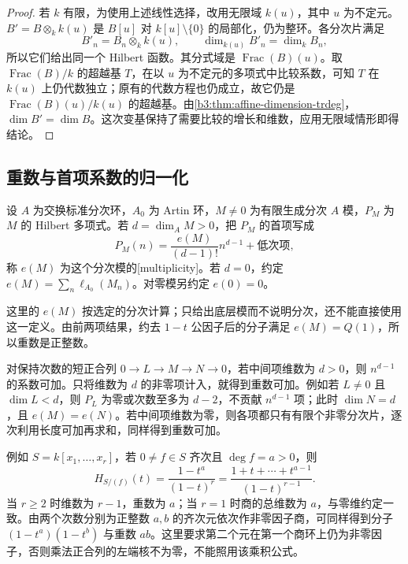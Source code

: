 \begin{proof}
	若 \(k\) 有限，为使用上述线性选择，改用无限域 \(k(u)\)，其中 \(u\) 为不定元。\(B'=B\otimes_k k(u)\) 是 \(B[u]\) 对 \(k[u]\setminus\{0\}\) 的局部化，仍为整环。各分次片满足
	\[
		B'_n=B_n\otimes_k k(u),\qquad \dim_{k(u)}B'_n=\dim_k B_n,
	\]
	所以它们给出同一个 Hilbert 函数。其分式域是 \(\operatorname{Frac}(B)(u)\)。取 \(\operatorname{Frac}(B)/k\) 的超越基 \(T\)，在以 \(u\) 为不定元的多项式中比较系数，可知 \(T\) 在 \(k(u)\) 上仍代数独立；原有的代数方程也仍成立，故它仍是 \(\operatorname{Frac}(B)(u)/k(u)\) 的超越基。由\cref{b3:thm:affine-dimension-trdeg}，\(\dim B'=\dim B\)。这次变基保持了需要比较的增长和维数，应用无限域情形即得结论。
\end{proof}

\subsection{重数与首项系数的归一化}
\label{b3:subsec:1103:03}

\begin{definition}\label{b3:def:graded-multiplicity}
	设 \(A\) 为交换标准分次环，\(A_0\) 为 Artin 环，\(M\ne0\) 为有限生成分次 \(A\) 模，\(P_M\) 为 \(M\) 的 Hilbert 多项式。若 \(d=\dim_A M>0\)，把 \(P_M\) 的首项写成
	\[
		P_M(n)=\dfrac{e(M)}{(d-1)!}n^{d-1}+\text{低次项},
	\]
	称 \(e(M)\) 为这个分次模的[multiplicity]。若 \(d=0\)，约定 \(e(M)=\sum_n\ell_{A_0}(M_n)\)。对零模另约定 \(e(0)=0\)。
\end{definition}

这里的 \(e(M)\) 按选定的分次计算；只给出底层模而不说明分次，还不能直接使用这一定义。由前两项结果，约去 \(1-t\) 公因子后的分子满足 \(e(M)=Q(1)\)，所以重数是正整数。

对保持次数的短正合列 \(0\to L\to M\to N\to0\)，若中间项维数为 \(d>0\)，则 \(n^{d-1}\) 的系数可加。只将维数为 \(d\) 的非零项计入，就得到重数可加。例如若 \(L\ne0\) 且 \(\dim L<d\)，则 \(P_L\) 为零或次数至多为 \(d-2\)，不贡献 \(n^{d-1}\) 项；此时 \(\dim N=d\)，且 \(e(M)=e(N)\)。若中间项维数为零，则各项都只有有限个非零分次片，逐次利用长度可加再求和，同样得到重数可加。

\ProseParagraphBreak
例如 \(S=k[x_1,\ldots,x_r]\)，若 \(0\ne f\in S\) 齐次且 \(\deg f=a>0\)，则
\[
	H_{S/(f)}(t)=\dfrac{1-t^a}{(1-t)^r} =\dfrac{1+t+\cdots+t^{a-1}}{(1-t)^{r-1}}.
\]
当 \(r\ge2\) 时维数为 \(r-1\)，重数为 \(a\)；当 \(r=1\) 时商的总维数为 \(a\)，与零维约定一致。由两个次数分别为正整数 \(a,b\) 的齐次元依次作非零因子商，可同样得到分子 \((1-t^a)(1-t^b)\) 与重数 \(ab\)。这里要求第二个元在第一个商环上仍为非零因子，否则乘法正合列的左端核不为零，不能照用该乘积公式。
